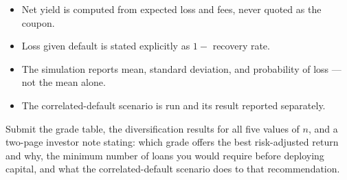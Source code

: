 \begin{verification}
\begin{itemize}
  \item Net yield is computed from expected loss and fees, never quoted as the coupon.
  \item Loss given default is stated explicitly as $1 -$ recovery rate.
  \item The simulation reports mean, standard deviation, and probability of loss --- not the mean alone.
  \item The correlated-default scenario is run and its result reported separately.
\end{itemize}
\end{verification}

\begin{labdeliverable}
Submit the grade table, the diversification results for all five values of $n$, and a two-page investor note stating: which grade offers the best risk-adjusted return and why, the minimum number of loans you would require before deploying capital, and what the correlated-default scenario does to that recommendation.
\end{labdeliverable}
